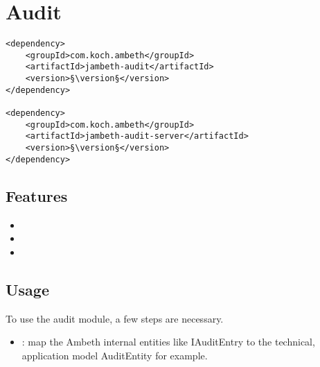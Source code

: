 \section{Audit}
\label{module:Audit}
\ClearAPI
\begin{lstlisting}[style=POM,caption={Maven modules to use \emph{Ambeth Audit}}]
<dependency>
	<groupId>com.koch.ambeth</groupId>
	<artifactId>jambeth-audit</artifactId>
	<version>§\version§</version>
</dependency>

<dependency>
	<groupId>com.koch.ambeth</groupId>
	<artifactId>jambeth-audit-server</artifactId>
	<version>§\version§</version>
</dependency>
\end{lstlisting}
\TODO
\subsection{Features}
\begin{itemize}
	\item {}
	\item {}
	\item {}
\end{itemize}
\subsection{Usage}
To use the audit module, a few steps are necessary.
\begin{itemize}

	\item {}: map the Ambeth internal entities like IAuditEntry to the technical, application model AuditEntity for example.


	
\end{itemize}

